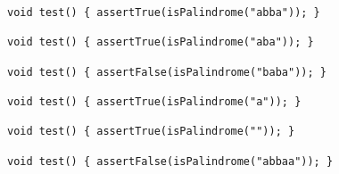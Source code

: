
\begin{minipage}{12cm}
\begin{lstlisting}[style=CStyle, caption=Example of an Improved Test Suite for the function \texttt{isPalindrome}., label=isPalindrome_TS_improved]
void test() { assertTrue(isPalindrome("abba")); }

void test() { assertTrue(isPalindrome("aba")); }

void test() { assertFalse(isPalindrome("baba")); }

void test() { assertTrue(isPalindrome("a")); }

void test() { assertTrue(isPalindrome("")); }

void test() { assertFalse(isPalindrome("abbaa")); }
\end{lstlisting}
\end{minipage}